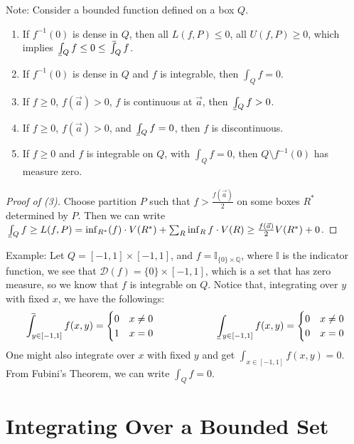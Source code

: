 \documentclass[11pt,oneside]{book}
\theoremstyle{break}
\theoremstyle{break}
\def\upint{\mathchoice%
    {\mkern13mu\overline{\vphantom{\intop}\mkern7mu}\mkern-20mu}%
    {\mkern7mu\overline{\vphantom{\intop}\mkern7mu}\mkern-14mu}%
    {\mkern7mu\overline{\vphantom{\intop}\mkern7mu}\mkern-14mu}%
    {\mkern7mu\overline{\vphantom{\intop}\mkern7mu}\mkern-14mu}%
  \int}
\def\lowint{\mkern3mu\underline{\vphantom{\intop}\mkern7mu}\mkern-10mu\int}
\newcommand{\Q}{\mathbb{Q}}
\newcommand{\D}{\mathcal{D}}
\newcommand{\note}{\color{red}Note: \color{black}}
\newcommand{\example}{\color{green}Example: \color{black}}
\begin{document}
\note Consider a bounded function defined on a box $Q$.
\begin{enumerate}[topsep=3pt,itemsep=-1ex,partopsep=1ex,parsep=1ex]
\item If $f^{-1}(0)$ is dense in $Q$, then all $L(f,P) \leq 0$, all $U(f,P) \geq 0$, which implies $\lowint_Q f \leq 0 \leq \upint_Q f$.
\item If $f^{-1}(0)$ is dense in $Q$ and $f$ is integrable, then $\int_Q f = 0$.
\item If $f \geq 0$, $f(\vec{a}) > 0$, $f $ is continuous at $\vec{a}$, then $\lowint_Q f > 0$. 
\item If $f \geq 0$, $f(\vec{a}) > 0$, and $\lowint_Q f =0$, then $f$ is discontinuous.
\item If $f \geq 0$ and $f$ is integrable on $Q$, with $\int_Q f = 0$, then $Q \setminus f^{-1}(0)$ has measure zero. 
\end{enumerate}
\begin{proof}[Proof of (3)]
Choose partition $P$ such that $f > \frac{f(\vec{a})}{2}$ on some boxes $R^*$ determined by $P$. Then we can write $\lowint_Q f \geq L(f,P) = \inf_{R^*} (f)\cdot V(R^*) + \sum_{R} \inf_R f\cdot V(R) \geq \frac{f(\vec{a})}{2}V(R^*)+ 0 $.
\end{proof}

\example Let $Q = [-1,1] \times [-1,1]$, and $f = \mathbb{I}_{\{0\} \times \Q}$, where $\mathbb{I}$ is the indicator function, we see that $\D(f) = \{0\} \times [-1,1]$, which is a set that has zero measure, so we know that $f$ is integrable on $Q$. Notice that, integrating over $y$ with fixed $x$, we have the followings:
$$\upint_{y \in [-1,1]} f(x,y)  = \begin{cases} 
0& x\neq 0 \\ 1 & x = 0
\end{cases} \qquad \qquad \qquad \lowint_{y \in [-1,1]} f(x,y) = \begin{cases} 0 & x \neq 0 \\ 0 & x= 0 \end{cases}$$
One might also integrate over $x$ with fixed $y$ and get $\int_{x \in [-1,1]} f(x,y) = 0$. From Fubini's Theorem, we can write $\int_Q f = 0$. \\




\newpage
\section[Integrating Over a Bounded Set]{\color{red} Integrating Over a Bounded Set \color{black}}
\end{document}
